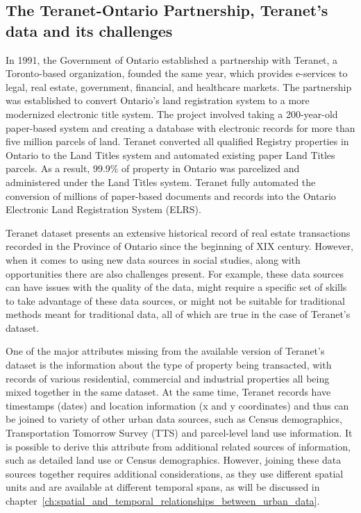 \subsection{The Teranet-Ontario Partnership, Teranet's data and its challenges} \label{subsec:teranet_ontario}

In 1991, the Government of Ontario established a partnership with Teranet, a Toronto-based organization, founded the same year, which provides e-services to legal, real estate, government, financial, and healthcare markets.
The partnership was established to convert Ontario's land registration system to a more modernized electronic title system.
The project involved taking a 200-year-old paper-based system and creating a database with electronic records for more than five million parcels of land.
Teranet converted all qualified Registry properties in Ontario to the Land Titles system and automated existing paper Land Titles parcels.
As a result, 99.9\% of property in Ontario was parcelized and administered under the Land Titles system.
Teranet fully automated the conversion of millions of paper-based documents and records into the Ontario Electronic Land Registration System (ELRS)\cite{TeranetEnterprisesInc.2019}.


Teranet dataset presents an extensive historical record of real estate transactions recorded in the Province of Ontario since the beginning of XIX century.
However, when it comes to using new data sources in social studies, along with opportunities there are also challenges present.
For example, these data sources can have issues with the quality of the data, might require a specific set of skills to take advantage of these data sources, or might not be suitable for traditional methods meant for traditional data\cite{Arribas-Bel2014}, all of which are true in the case of Teranet's dataset.

One of the major attributes missing from the available version of Teranet's dataset is the information about the type of property being transacted, with records of various residential, commercial and industrial properties all being mixed together in the same dataset.
At the same time, Teranet records have timestamps (dates) and location information (x and y coordinates) and thus can be joined to variety of other urban data sources, such as Census demographics, Transportation Tomorrow Survey (TTS) and parcel-level land use information.
It is possible to derive this attribute from additional related sources of information, such as detailed land use or Census demographics.
However, joining these data sources together requires additional considerations, as they use different spatial units and are available at different temporal spans, as will be discussed in chapter~\ref{ch:spatial_and_temporal_relationships_between_urban_data}.


